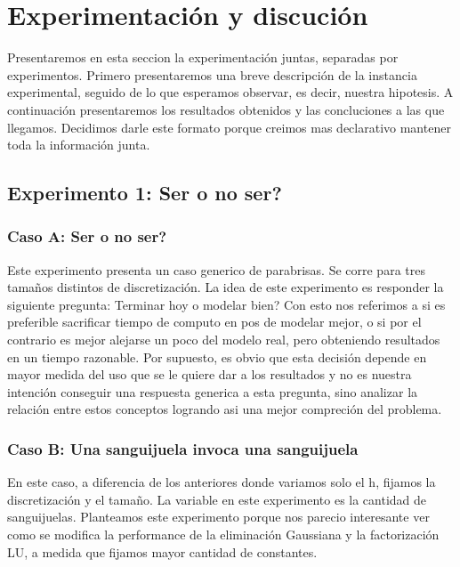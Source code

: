 \section{Experimentaci\'on y discuci\'on}

Presentaremos en esta seccion la experimentaci\'on juntas, separadas por experimentos. Primero presentaremos una breve descripci\'on de la instancia 
experimental, seguido de lo que esperamos observar, es decir, nuestra hipotesis. A continuaci\'on presentaremos los resultados obtenidos y las
concluciones a las que llegamos. Decidimos darle este formato porque creimos mas declarativo mantener toda la informaci\'on junta. 

\subsection{Experimento 1: \textquestiondown Ser o no ser?}

\subsubsection{Caso A: \textquestiondown Ser o no ser?}

Este experimento presenta un caso generico de parabrisas. Se corre para tres tama\~nos distintos de discretizaci\'on. La idea de este experimento
es responder la siguiente pregunta: \textquestiondown Terminar hoy o modelar bien? Con esto nos referimos a si es preferible sacrificar tiempo de computo en 
pos de modelar mejor, o si por el contrario es mejor alejarse un poco del modelo real, pero obteniendo resultados en un tiempo razonable. Por 
supuesto, es obvio que esta decisi\'on depende en mayor medida del uso que se le quiere dar a los resultados y no es nuestra intenci\'on conseguir 
una respuesta generica a esta pregunta, sino analizar la relaci\'on entre estos conceptos logrando asi una mejor compreci\'on del problema.

\subsubsection{Caso B: Una sanguijuela invoca una sanguijuela}

En este caso, a diferencia de los anteriores donde variamos solo el h, fijamos la discretizaci\'on y el tama\~no. La variable en este experimento 
es la cantidad de sanguijuelas. Planteamos este experimento porque nos parecio interesante ver como se modifica la performance de la eliminaci\'on 
Gaussiana y la factorizaci\'on LU, a medida que fijamos mayor cantidad de constantes.

